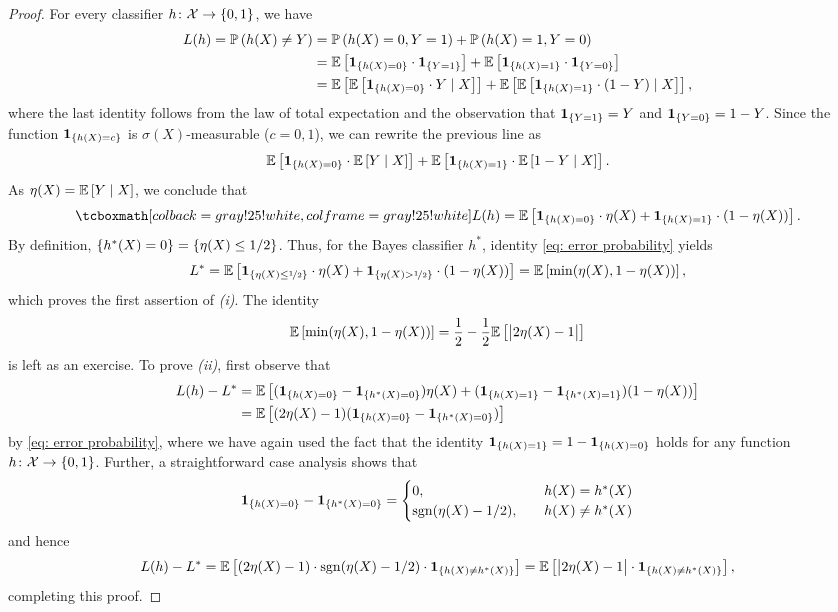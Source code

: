\begin{proof}
For every classifier $h \colon \mathcal{X} \to \left\{0, 1\right\}$, we have
\begin{align*}
    L(h) = \mathbb{P}\left(h(X) \neq Y\right) &= \mathbb{P}\left(h(X) = 0, Y = 1\right) + \mathbb{P}\left(h(X) = 1, Y = 0\right) \\
        &= \mathbb{E}\left[\mathbf{1}_{\left\{h(X) = 0\right\}} \cdot \mathbf{1}_{\left\{Y = 1\right\}}\right] + \mathbb{E}\left[\mathbf{1}_{\left\{h(X) = 1\right\}} \cdot \mathbf{1}_{\left\{Y = 0\right\}}\right] \\
        &= \mathbb{E}\left[\mathbb{E}\left[\mathbf{1}_{\left\{h(X) = 0\right\}} \cdot Y \mathrel{|} X\right]\right] + \mathbb{E}\left[\mathbb{E}\left[\mathbf{1}_{\left\{h(X) = 1\right\}} \cdot (1 - Y) \mathrel{|} X\right]\right],
\end{align*}
where the last identity follows from the law of total expectation and the observation that $\mathbf{1}_{\left\{Y = 1\right\}} = Y$ and $\mathbf{1}_{\left\{Y = 0\right\}} = 1 - Y$. Since the function $\mathbf{1}_{\left\{h(X) = c\right\}}$ is $\sigma(X)$-measurable ($c = 0, 1$), we can rewrite the previous line as
\[
    \mathbb{E}\left[\mathbf{1}_{\left\{h(X) = 0\right\}} \cdot \mathbb{E}\left[Y \mathrel{|} X\right]\right] + \mathbb{E}\left[\mathbf{1}_{\left\{h(X) = 1\right\}} \cdot \mathbb{E}\left[1 - Y \mathrel{|} X\right]\right].
\]
As $\eta(X) = \mathbb{E}\left[Y \mathrel{|} X\right]$, we conclude that
\begin{equation}
    \label{eq: error probability}
    \highlightMath{
        L(h) = \Ex{\indSet{h(X) = 0} \cdot \eta(X) + \indSet{h(X) = 1} \cdot (1 - \eta(X))}.
    }
\end{equation}
By definition, $\left\{h^*(X) = 0\right\} = \left\{\eta(X) \leq 1/2\right\}$. Thus, for the Bayes classifier $h^*$, identity \eqref{eq: error probability} yields
\[
    L^* = \mathbb{E}\left[\mathbf{1}_{\left\{\eta(X) \leq \nicefrac{1}{2}\right\}} \cdot \eta(X) + \mathbf{1}_{\left\{\eta(X) > \nicefrac{1}{2}\right\}} \cdot (1 - \eta(X))\right] = \mathbb{E}\left[\min(\eta(X), 1 - \eta(X))\right],
\]
which proves the first assertion of \emph{(i)}. The identity
\[
    \mathbb{E}\left[\min(\eta(X), 1 - \eta(X))\right] = \frac{1}{2} - \frac{1}{2} \mathbb{E}\left[\big\lvert 2\eta(X) - 1 \big\rvert\right]
\]
is left as an exercise. To prove \emph{(ii)}, first observe that
\begin{align*}
    L(h) - L^*& = \mathbb{E}\left[(\mathbf{1}_{\left\{h(X) = 0\right\}} - \mathbf{1}_{\left\{h^*(X) = 0\right\}}) \eta(X) + (\mathbf{1}_{\left\{h(X) = 1\right\}} - \mathbf{1}_{\left\{h^*(X) = 1\right\}}) (1 - \eta(X))\right] \\
        &= \mathbb{E}\left[(2 \eta(X) - 1) (\mathbf{1}_{\left\{h(X) = 0\right\}} - \mathbf{1}_{\left\{h^*(X) = 0\right\}})\right]
\end{align*}
by \eqref{eq: error probability}, where we have again used the fact that the identity $\mathbf{1}_{\left\{h(X) = 1\right\}} = 1 - \mathbf{1}_{\left\{h(X) = 0\right\}}$ holds for any function $h \colon \mathcal{X} \to \left\{0, 1\right\}$. Further, a straightforward case analysis shows that
\[
    \mathbf{1}_{\left\{h(X) = 0\right\}} - \mathbf{1}_{\left\{h^*(X) = 0\right\}} = \begin{cases}
        0, \quad & h(X) = h^*(X) \\
        \mathrm{sgn}(\eta(X) - 1/2), \quad & h(X) \neq h^*(X)
    \end{cases}
\]
and hence
\[
    L(h) - L^* = \mathbb{E}\left[(2\eta(X) - 1) \cdot \mathrm{sgn}(\eta(X) - 1/2) \cdot \mathbf{1}_{\left\{h(X) \neq h^*(X)\right\}}\right] = \mathbb{E}\left[\big\lvert 2\eta(X) - 1 \big\rvert \cdot \mathbf{1}_{\left\{h(X) \neq h^*(X)\right\}}\right],
\]
completing this proof.
\end{proof}

